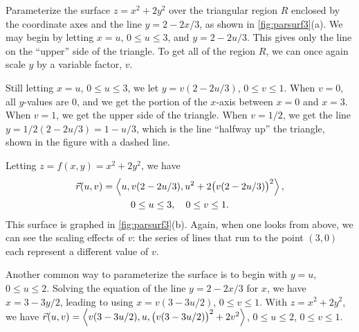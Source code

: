\begin{example}\label{ex_parsurf3}%
Parameterize the surface $z=x^2+2y^2$ over the triangular region $R$ enclosed by the coordinate axes and the line $y=2-2x/3$, as shown in \autoref{fig:parsurf3}(a).
\solution
We may begin by letting $x=u$, $0\leq u\leq 3$,  and $y = 2-2u/3$. This gives only the line on the ``upper'' side of the triangle. To get all of the region $R$, we can once again scale $y$ by a variable factor, $v$.

Still letting $x = u$, $0\leq u\leq 3$, we let $y = v(2-2u/3)$, $0\leq v\leq 1$. When $v=0$, all $y$-values are 0, and we get the portion of the $x$-axis between $x=0$ and $x=3$. When $v=1$, we get the upper side of the triangle. When $v=1/2$, we get the line $y=1/2(2-2u/3) = 1-u/3$, which is the line ``halfway up'' the triangle, shown in the figure with a dashed line.

Letting $z = f(x,y) = x^2+2y^2$, we have
\begin{multline*}
\vec r(u,v) =\left\langle u, v(2-2u/3), u^2+2\bigl(v(2-2u/3)\bigr)^2\right\rangle,\\
0\leq u\leq 3,\quad 0\leq v\leq 1.
\end{multline*}
This surface is graphed in \autoref{fig:parsurf3}(b). Again, when one looks from above, we can see the scaling effects of $v$: the series of lines that run to the point $(3,0)$ each represent a different value of $v$.

Another common way to parameterize the surface is to begin with $y=u$, $0\leq u\leq 2$. Solving the equation of the line $y=2-2x/3$ for $x$, we have $x = 3-3y/2$, leading to using $x=v(3-3u/2)$, $0\leq v\leq 1$. With $z=x^2+2y^2$, we have $\vec r(u,v) =\left\langle v(3-3u/2),u, \bigl(v(3-3u/2)\bigr)^2+2v^2\right\rangle$, $0\leq u\leq 2$, $0\leq v\leq 1$.
\end{example}

